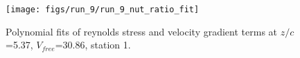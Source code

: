 \begin{figure}[H]
\centering
\texttt{[image: figs/run\_9/run\_9\_nut\_ratio\_fit]}
\caption{Polynomial fits of reynolds stress and velocity gradient terms at $z/c$=5.37, $V_{free}$=30.86, station 1.}
\label{fig:run_9_nut_ratio_fit}
\end{figure}


